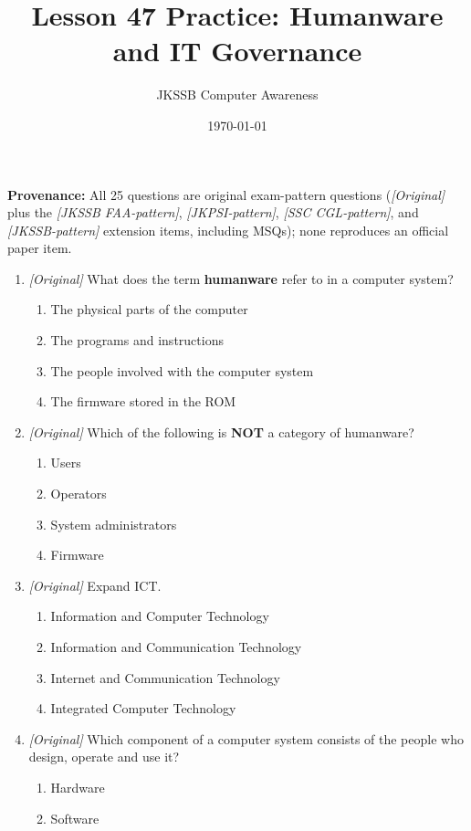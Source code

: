 \documentclass[11pt]{article}
\title{Lesson 47 Practice: Humanware and IT Governance}
\author{JKSSB Computer Awareness}
\date{\today}
\begin{document}
\maketitle
\noindent\textbf{Provenance:} All 25 questions are original exam-pattern questions (\textit{[Original]} plus the \textit{[JKSSB FAA-pattern]}, \textit{[JKPSI-pattern]}, \textit{[SSC CGL-pattern]}, and \textit{[JKSSB-pattern]} extension items, including MSQs); none reproduces an official paper item.

\begin{enumerate}[label=\textbf{Q\arabic*.}, leftmargin=*]
\item \textit{[Original]} What does the term \textbf{humanware} refer to in a
  computer system?
  \begin{enumerate}[label=\Alph*.]
    \item The physical parts of the computer
    \item The programs and instructions
    \item The people involved with the computer system
    \item The firmware stored in the ROM
  \end{enumerate}
\item \textit{[Original]} Which of the following is \textbf{NOT} a category of
  humanware?
  \begin{enumerate}[label=\Alph*.]
    \item Users
    \item Operators
    \item System administrators
    \item Firmware
  \end{enumerate}
\item \textit{[Original]} Expand ICT.
  \begin{enumerate}[label=\Alph*.]
    \item Information and Computer Technology
    \item Information and Communication Technology
    \item Internet and Communication Technology
    \item Integrated Computer Technology
  \end{enumerate}
\item \textit{[Original]} Which component of a computer system consists of the
  people who design, operate and use it?
  \begin{enumerate}[label=\Alph*.]
    \item Hardware
    \item Software

\end{enumerate}
\end{enumerate}
\end{document}
